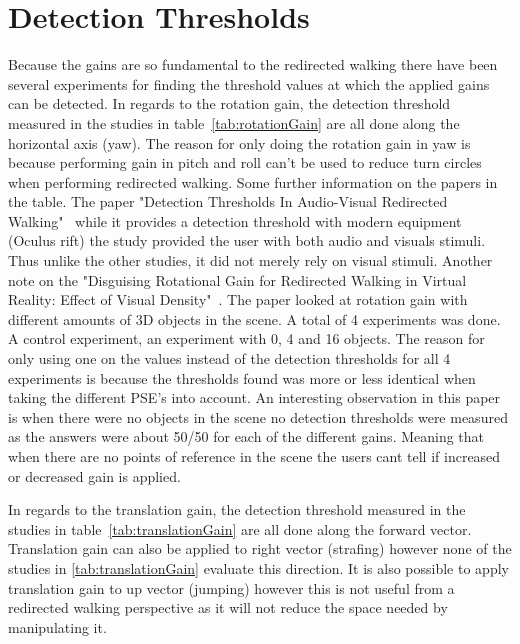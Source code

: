 
\section*{Detection Thresholds}
Because the gains are so fundamental to the redirected walking there have been several experiments for finding the threshold values at which the applied gains can be detected. In regards to the rotation gain, the detection threshold measured in the studies in table~\ref{tab:rotationGain} are all done along the horizontal axis (yaw). The reason for only doing the rotation gain in yaw is because performing gain in pitch and roll can't be used to reduce turn circles when performing redirected walking. Some further information on the papers in the table. The paper "Detection Thresholds In Audio-Visual Redirected Walking"~\cite{meyer2016detection} while it provides a detection threshold with modern equipment (Oculus rift) the study provided the user with both audio and visuals stimuli. Thus unlike the other studies, it did not merely rely on visual stimuli. Another note on the "Disguising Rotational Gain for Redirected Walking in Virtual Reality: Effect of Visual Density"~\cite{paludan2016disguising}. The paper looked at rotation gain with different amounts of 3D objects in the scene. A total of 4 experiments was done. A control experiment, an experiment with 0, 4 and 16 objects. The reason for only using one on the values instead of the detection thresholds for all 4 experiments is because the thresholds found was more or less identical when taking the different PSE's into account. An interesting observation in this paper is when there were no objects in the scene no detection thresholds were measured as the answers were about 50/50 for each of the different gains. Meaning that when there are no points of reference in the scene the users cant tell if increased or decreased gain is applied.
\bigskip

\noindent
In regards to the translation gain, the detection threshold measured in the studies in table~\ref{tab:translationGain} are all done along the forward vector. Translation gain can also be applied to right vector (strafing) however none of the studies in \ref{tab:translationGain} evaluate this direction. It is also possible to apply translation gain to up vector (jumping) however this is not useful from a redirected walking perspective as it will not reduce the space needed by manipulating it.
\bigskip

